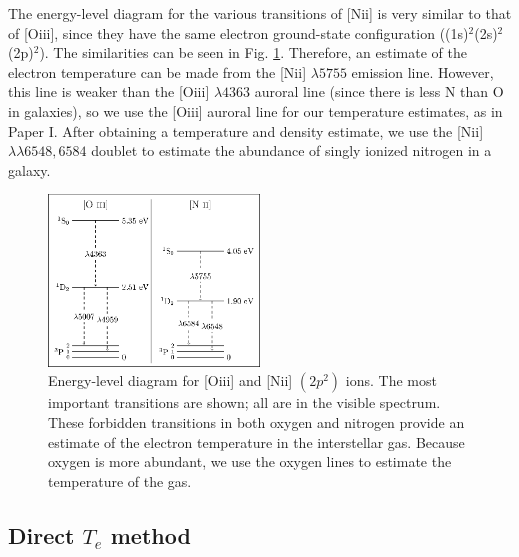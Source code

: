 The energy-level diagram for the various transitions of [N{\sc ii}] is very 
similar to that of [O{\sc iii}], since they have the same electron ground-state 
configuration ((1s)$^2$(2s)$^2$(2p)$^2$).  The similarities can be seen in Fig. 
\ref{fig:transitions_P2}.  Therefore, an estimate of the electron temperature can 
be made from the [N{\sc ii}] $\lambda 5755$ emission line.  However, this line 
is weaker than the [O{\sc iii}] $\lambda 4363$ auroral line (since there is less 
N than O in galaxies), so we use the [O{\sc iii}] auroral line for our 
temperature estimates, as in Paper I.  After obtaining a temperature and density 
estimate, we use the [N{\sc ii}] $\lambda \lambda 6548, 6584$ doublet to 
estimate the abundance of singly ionized nitrogen in a galaxy.

\begin{figure}
    \centering
    \includegraphics[width=0.5\textwidth]{Images/Paper2/NIIOIII_energy_level_diagram-figure0}
    \caption[{[] and [] energy-level diagram}]{Energy-level 
    diagram for [O{\sc iii}] and [N{\sc ii}] $(2p^2)$ ions.  The most important 
    transitions are shown; all are in the visible spectrum.  These forbidden 
    transitions in both oxygen and nitrogen provide an estimate of the electron 
    temperature in the interstellar gas.  Because oxygen is more abundant, we 
    use the oxygen lines to estimate the temperature of the gas.}
    \label{fig:transitions_P2}
\end{figure}


\subsection{Direct $T_e$ method}

